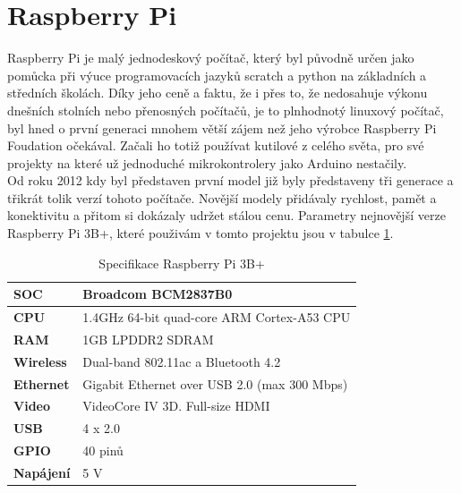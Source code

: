 \documentclass{ctuthesis}
\begin{document}
\section{Raspberry Pi}
Raspberry Pi je malý jednodeskový počítač, který byl původně určen jako pomůcka při výuce programovacích jazyků scratch a python na základních a středních školách. Díky jeho ceně a faktu, že i přes to, že nedosahuje výkonu dnešních stolních nebo přenosných počítačů, je to plnhodnotý linuxový počítač, byl hned o první generaci mnohem větší zájem než jeho výrobce Raspberry Pi Foudation očekával. Začali ho totiž používat kutilové z celého světa, pro své projekty na které už jednoduché mikrokontrolery jako Arduino nestačily. \cite{opensource} \\
Od roku 2012 kdy byl představen první model \cite{conorlyons2015} již byly představeny tři generace a třikrát tolik verzí tohoto počítače. Novější modely přidávaly rychlost, pamět a konektivitu a přitom si dokázaly udržet stálou cenu. Parametry nejnovější verze Raspberry Pi 3B+, které použivám v tomto projektu jsou v tabulce \ref{tab:pi}.
\begin{table}[]
\begin{ctucolortab}
\begin{tabular}{|l|l|}
\hline
\textbf{SOC}      & Broadcom BCM2837B0                  \\ \hline
\textbf{CPU}      & 1.4GHz 64-bit quad-core ARM Cortex-A53 CPU                           \\ \hline
\textbf{RAM}      & 1GB LPDDR2 SDRAM                                                     \\ \hline
\textbf{Wireless} & Dual-band 802.11ac a Bluetooth 4.2 \\ \hline
\textbf{Ethernet} & Gigabit Ethernet over USB 2.0 (max 300 Mbps)                         \\ \hline
\textbf{Video}    & VideoCore IV 3D. Full-size HDMI                                      \\ \hline
\textbf{USB}      & 4 x 2.0                                                              \\ \hline
\textbf{GPIO}     & 40 pinů                                                              \\ \hline
\textbf{Napájení} & 5 V                                                                  \\ \hline
\end{tabular}
\caption{Specifikace Raspberry Pi 3B+ \cite{conorlyons2015}}
\label{tab:pi}
\end{ctucolortab}
\end{table}
\end{document}
